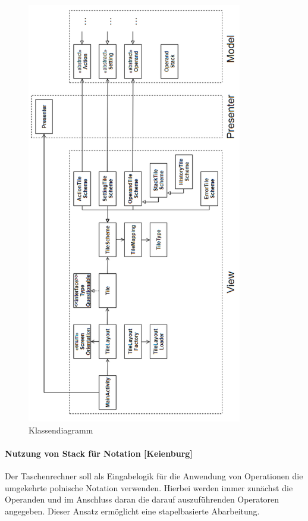 \begin{figure}[!h]
	\includegraphics[width=\textwidth,height=50em,keepaspectratio]{img/schnittstellen-klassendiagramm}
	\caption[Klassendiagramm]{Klassendiagramm\footnotemark}
\end{figure}


\clearpage

\paragraph{Nutzung von Stack für Notation [Keienburg]}

Der Taschenrechner soll als Eingabelogik für die Anwendung von Operationen die umgekehrte polnische Notation verwenden. Hierbei werden immer zunächst die Operanden und im Anschluss daran die darauf auszuführenden Operatoren angegeben. Dieser Ansatz ermöglicht eine stapelbasierte Abarbeitung. 

